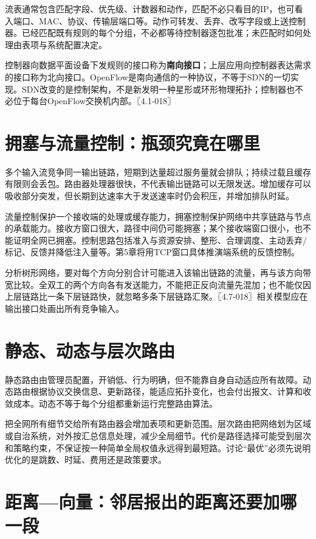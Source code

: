 流表通常包含匹配字段、优先级、计数器和动作，匹配不必只看目的IP，也可看入端口、MAC、协议、传输层端口等。动作可转发、丢弃、改写字段或上送控制器。已经匹配既有规则的每个分组，不必都等待控制器逐包批准；未匹配时如何处理由表项与系统配置决定。

控制器向数据平面设备下发规则的接口称为\textbf{南向接口}；上层应用向控制器表达需求的接口称为北向接口。OpenFlow是南向通信的一种协议，不等于SDN的一切实现。SDN改变的是控制架构，不是新发明一种星形或环形物理拓扑；控制器也不必位于每台OpenFlow交换机内部。〖4.1-018〗

\section{拥塞与流量控制：瓶颈究竟在哪里}\label{cn-04-03}

多个输入流竞争同一输出链路，短期到达量超过服务量就会排队；持续过载且缓存有限则会丢包。路由器处理器很快，不代表输出链路可以无限发送。增加缓存可以吸收部分突发，但长期到达速率大于发送速率时仍会积压，并增加排队时延。

流量控制保护一个接收端的处理或缓存能力，拥塞控制保护网络中共享链路与节点的承载能力。接收方窗口很大，路径中间仍可能拥塞；某个接收端窗口很小，也不能证明全网已拥塞。控制思路包括准入与资源安排、整形、合理调度、主动丢弃/标记、反馈并降低注入量等。第5章将用TCP窗口具体推演端系统的反馈控制。

分析树形网络，要对每个方向分别合计可能进入该输出链路的流量，再与该方向带宽比较。全双工的两个方向各有发送能力，不能把正反向流量先混加；也不能仅因上层链路比一条下层链路快，就忽略多条下层链路汇聚。〖4.7-018〗相关模型应在输出接口处画出所有竞争输入。

\section{静态、动态与层次路由}\label{cn-04-04}

静态路由由管理员配置，开销低、行为明确，但不能靠自身自动适应所有故障。动态路由根据协议交换信息、更新路径，能适应拓扑变化，也会付出报文、计算和收敛成本。动态不等于每个分组都重新运行完整路由算法。

把全网所有细节交给所有路由器会增加表项和更新范围。层次路由把网络划为区域或自治系统，对外按汇总信息处理，减少全局细节。代价是路径选择可能受到层次和策略约束，不保证按一种简单全局权值永远得到最短路。讨论``最优''必须先说明优化的是跳数、时延、费用还是政策要求。

\section{距离---向量：邻居报出的距离还要加哪一段}\label{cn-04-05}

